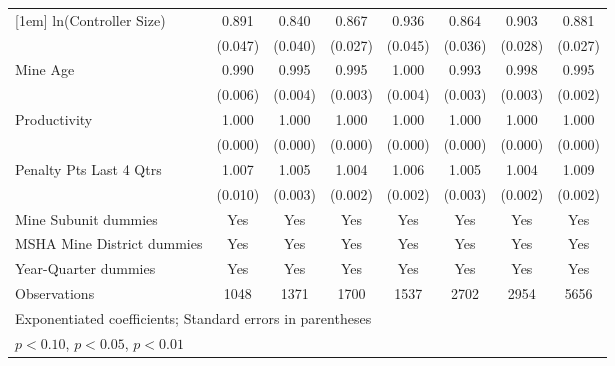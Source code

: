 {\begin{tabular}{l*{7}{c}}
[1em]
ln(Controller Size)      &       0.891\sym{**} &       0.840\sym{***}&       0.867\sym{***}&       0.936         &       0.864\sym{***}&       0.903\sym{***}&       0.881\sym{***}\\
                         &     (0.047)         &     (0.040)         &     (0.027)         &     (0.045)         &     (0.036)         &     (0.028)         &     (0.027)         \\
[1em]
Mine Age                 &       0.990\sym{*}  &       0.995         &       0.995\sym{*}  &       1.000         &       0.993\sym{*}  &       0.998         &       0.995\sym{**} \\
                         &     (0.006)         &     (0.004)         &     (0.003)         &     (0.004)         &     (0.003)         &     (0.003)         &     (0.002)         \\
[1em]
Productivity             &       1.000\sym{**} &       1.000         &       1.000         &       1.000         &       1.000\sym{**} &       1.000\sym{**} &       1.000         \\
                         &     (0.000)         &     (0.000)         &     (0.000)         &     (0.000)         &     (0.000)         &     (0.000)         &     (0.000)         \\
[1em]
Penalty Pts Last 4 Qtrs  &       1.007         &       1.005         &       1.004         &       1.006\sym{**} &       1.005\sym{*}  &       1.004\sym{**} &       1.009\sym{***}\\
                         &     (0.010)         &     (0.003)         &     (0.002)         &     (0.002)         &     (0.003)         &     (0.002)         &     (0.002)         \\
[1em]
Mine Subunit dummies     &         Yes         &         Yes         &         Yes         &         Yes         &         Yes         &         Yes         &         Yes         \\
[1em]
MSHA Mine District dummies&         Yes         &         Yes         &         Yes         &         Yes         &         Yes         &         Yes         &         Yes         \\
[1em]
Year-Quarter dummies     &         Yes         &         Yes         &         Yes         &         Yes         &         Yes         &         Yes         &         Yes         \\
\hline
Observations             &        1048         &        1371         &        1700         &        1537         &        2702         &        2954         &        5656         \\
\hline\hline
\multicolumn{8}{l}{\footnotesize Exponentiated coefficients; Standard errors in parentheses}\\
\multicolumn{8}{l}{\footnotesize \sym{*} \(p<0.10\), \sym{**} \(p<0.05\), \sym{***} \(p<0.01\)}\\
\end{tabular}
}
